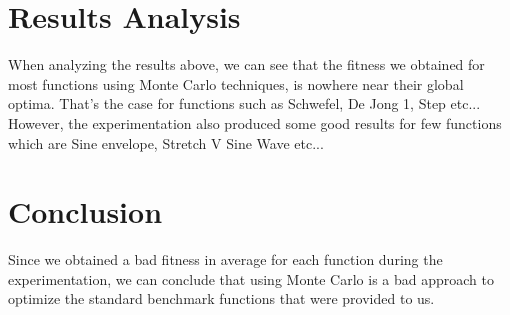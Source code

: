 \documentclass[12pt]{article}
\begin{document}
	\section{Results Analysis}
	When analyzing the results above, we can see that the fitness we obtained for most functions using Monte Carlo techniques, is nowhere near their global optima. That's the case for functions such as Schwefel, De Jong 1, Step etc... However, the experimentation also produced some good results for few functions which are Sine envelope, Stretch V Sine Wave etc...
	
	\section{Conclusion}
		Since we obtained a bad fitness in average for each function during the experimentation, we can conclude that using Monte Carlo is a bad approach to optimize the standard benchmark functions that were provided to us.
	
\end{document}
